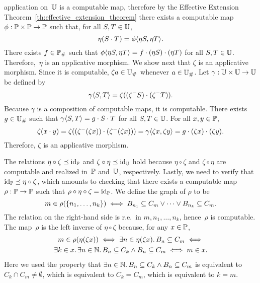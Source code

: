 application on~$\UU$ is a computable map, therefore by the Effective
Extension Theorem~\ref{th:effective_extension_theorem} there exists a
computable map $\phi: \Scott \times \Scott \to \Scott$ such that, for all $S, T
\in \UU$,
\begin{equation*}
  \eta (S \cdot T) = \phi \pair{\eta S, \eta T}.
\end{equation*}
There exists $f \in \comp{\Scott}$ such that $\phi \pair{\eta S, \eta T} = f
\cdot (\eta S) \cdot (\eta T)$ for all $S, T \in \UU$.
Therefore,~$\eta$ is an applicative morphism. We show next that
$\zeta$ is an applicative morphism. Since it is computable, $\zeta a
\in \comp{\UU}$ whenever $a \in \comp{\UU}$. Let $\gamma: \UU \times \UU \to
\UU$ be defined by
\begin{equation*}
  \gamma \pair{S, T} = \zeta ((\zeta^{-} S) \cdot (\zeta^{-} T)).
\end{equation*}
Because $\gamma$ is a composition of computable maps, it is
computable. There exists $g \in \comp{\UU}$ such that $\gamma \pair{S, T}
= g \cdot S \cdot T$ for all $S, T \in \UU$. For all $x, y \in \Scott$,
\begin{equation*}
  \zeta(x \cdot y) =
  \zeta((\zeta^{-} (\zeta x)) \cdot (\zeta^{-} (\zeta x))) =
  \gamma \pair{\zeta x, \zeta y} = g \cdot (\zeta x) \cdot (\zeta y).
\end{equation*}
Therefore, $\zeta$ is an applicative morphism.

The relations $\eta \circ \zeta \preceq \id[\Scott]$ and $\zeta \circ \eta 
\preceq \id[\UU]$ hold because $\eta \circ \zeta$ and $\zeta \circ
\eta$ are computable and realized in~$\Scott$ and~$\UU$, respectively.
Lastly, we need to verify that $\id[\Scott] \preceq \eta \circ \zeta$,
which amounts to checking that there exists a computable map $\rho:
\Scott \to \Scott$ such that $\rho \circ \eta \circ \zeta = \id[\Scott]$.
We define the graph of $\rho$ to be
%
\begin{equation*}
  m \in \rho(\set{n_1, \ldots, n_k})
  \iff
  B_{n_1} \subseteq C_m \lor \cdots \lor B_{n_k} \subseteq C_m.
\end{equation*}
%
The relation on the right-hand side is r.e.~in $m, n_1, \ldots, n_k$,
hence~$\rho$ is computable. The map~$\rho$ is the left inverse of
$\eta \circ \zeta$ because, for any $x \in \Scott$,
%
\begin{multline*}
  m \in \rho(\eta(\zeta x)) \iff
  \some{n \in \eta(\zeta x)} B_n \subseteq C_m \iff \\
  \some{k \in x} \some{n \in \NN}
      B_n \subseteq C_k \land B_n \subseteq C_m
  \iff
  m \in x.
\end{multline*}
%
Here we used the property that $\some{n \in \NN} B_n \subseteq C_k \land
  B_n \subseteq C_m$ is equivalent to $C_k \cap C_m \neq
\emptyset$, which is equivalent to $C_k = C_m$, which is equivalent to
$k = m$.

